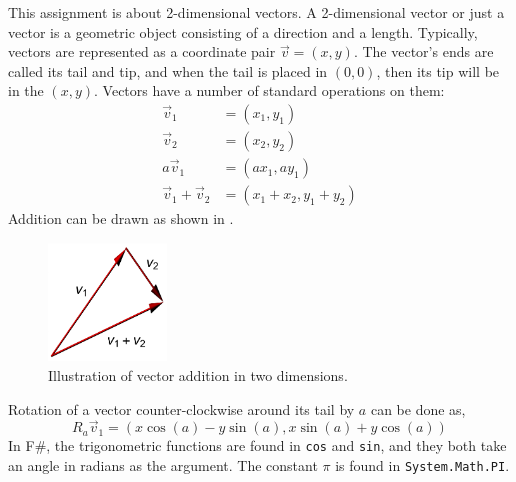 This assignment is about 2-dimensional vectors. A 2-dimensional vector or just a vector is a geometric object consisting of a direction and a length. Typically, vectors are represented as a coordinate pair $\vec v  = (x, y)$. The vector's ends are called its tail and tip, and when the tail is placed in $(0, 0)$, then its tip will be in the  $(x, y)$. Vectors have a number of standard operations on them:
\begin{align}
  \vec v_1 &= (x_1, y_1)
  \\\vec v_2 &= (x_2, y_2)
  \\a \vec v_1 &= (a x_1, a y_1)
  \\\vec v_1 + \vec v_2 &= (x_1+x_2, y_1+y_2)
\end{align}
Addition can be drawn as shown in .
\begin{figure}
  \centering
  \includegraphics[width=0.28\textwidth]{vectorAddition}
  \caption{Illustration of vector addition in two dimensions.}
  \label{fig:vectorAddition}
\end{figure}
Rotation of a vector counter-clockwise around its tail by $a$ can be done as,
\begin{equation}
  R_a \vec v_1 = (x\cos(a) - y\sin(a),x\sin(a)+y\cos(a))
\end{equation}
In F\#, the trigonometric functions are found in \lstinline{cos} and \lstinline{sin}, and they both take an angle in radians as the argument. The constant $\pi$ is found in \lstinline{System.Math.PI}.
